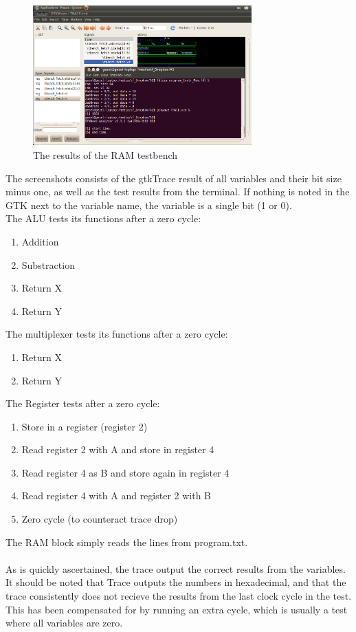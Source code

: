 \documentclass[12pt,a4paper]{article}
\begin{document}
\begin{figure}[h!]
  \centering
    \includegraphics[width=0.75\textwidth]{results_Instr_Mem.png}
  \caption{The results of the RAM testbench}
\end{figure}

The screenshots consists of the gtkTrace result of all variables and their bit size minus one, as well as the test results from the terminal. If nothing is noted in the GTK next to the variable name, the variable is a single bit (1 or 0). \\
The ALU tests its functions after a zero cycle: \\
\begin{enumerate}
\item Addition
\item Substraction
\item Return X
\item Return Y
\end{enumerate}
The multiplexer tests its functions after a zero cycle:\\ 
\begin{enumerate}
\item Return X
\item Return Y
\end{enumerate}
The Register tests after a zero cycle:\\
\begin{enumerate}
\item Store in a register (register 2)
\item Read register 2 with A and store in register 4
\item Read register 4 as B and store again in register 4
\item Read register 4 with A and register 2 with B
\item Zero cycle (to counteract trace drop)
\end{enumerate}
The RAM block simply reads the lines from program.txt.\\
\\
As is quickly ascertained, the trace output the correct results from the variables.
It should be noted that Trace outputs the numbers in hexadecimal, and that the trace consistently does not recieve the results from the last clock cycle in the test. This has been compensated for by running an extra cycle, which is usually a test where all variables are zero.
\end{document}
